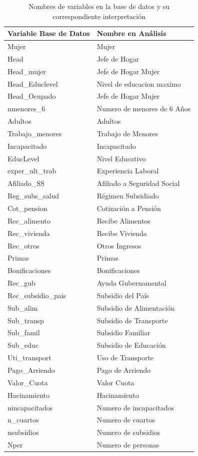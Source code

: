 \documentclass[a4paper]{article}
\theoremstyle{remark}
\theoremstyle{definition}
\begin{document}
\begin{table}[!htbp] 
\centering 
\caption{Nombres de variables en la base de datos y su correspondiente interpretación}
\begin{tabular}{|l|l|}
\hline
\textbf{Variable Base de Datos} & \textbf{Nombre en Análisis} \\ 
\hline
Mujer & Mujer \\ 
Head & Jefe de Hogar \\ 
Head\_mujer & Jefe de Hogar Mujer \\ 
Head\_Educlevel & Nivel de educacion maximo\\ 
Head\_Ocupado & Jefe de Hogar Mujer \\ 
nmenores\_6 & Numero de menores de 6 Años \\ 
Adultos & Adultos \\ 
Trabajo\_menores & Trabajo de Menores \\ 
Incapacitado & Incapacitado \\ 
EducLevel & Nivel Educativo \\ 
exper\_ult\_trab & Experiencia Laboral \\ 
Afiliado\_SS & Afiliado a Seguridad Social \\ 
Reg\_subs\_salud & Régimen Subsidiado \\ 
Cot\_pension & Cotización a Pensión \\ 
Rec\_alimento & Recibe Alimentos \\ 
Rec\_vivienda & Recibe Vivienda \\ 
Rec\_otros & Otros Ingresos \\ 
Primas & Primas \\ 
Bonificaciones & Bonificaciones \\ 
Rec\_gub & Ayuda Gubernamental \\ 
Rec\_subsidio\_pais & Subsidio del País \\ 
Sub\_alim & Subsidio de Alimentación \\ 
Sub\_transp & Subsidio de Transporte \\ 
Sub\_famil & Subsidio Familiar \\ 
Sub\_educ & Subsidio de Educación \\ 
Uti\_transport & Uso de Transporte \\ 
Pago\_Arriendo & Pago de Arriendo \\ 
Valor\_Cuota & Valor Cuota \\ 
Hacinamiento & Hacinamiento \\ 
nincapacitados & Numero de incapacitados \\
n\_cuartos & Numero de cuartos \\
nsubsidios & Numero de subsidios \\
Nper & Numero de personas \\
\hline
\end{tabular} 
\end{table}
\end{document}

